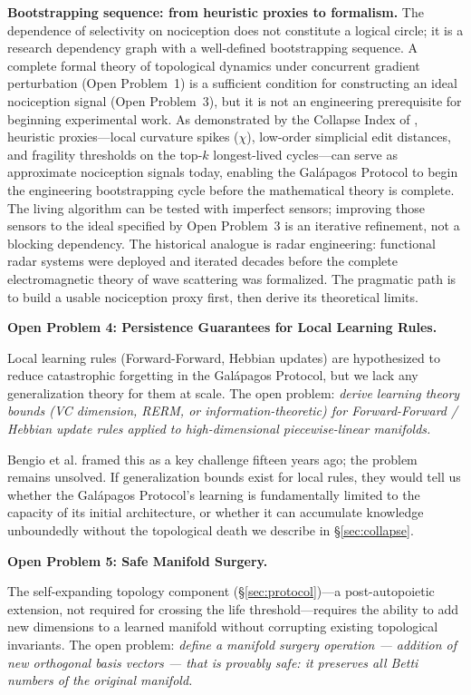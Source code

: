 \documentclass{article}
\begin{document}
\medskip
\noindent\textbf{Bootstrapping sequence: from heuristic proxies to formalism.}
The dependence of selectivity on nociception does not constitute a logical circle; it is a research dependency graph with a well-defined bootstrapping sequence. A complete formal theory of topological dynamics under concurrent gradient perturbation (Open Problem~1) is a sufficient condition for constructing an ideal nociception signal (Open Problem~3), but it is not an engineering prerequisite for beginning experimental work. As demonstrated by the Collapse Index of \citet{Kalinowski2026collapse}, heuristic proxies---local curvature spikes ($\chi$), low-order simplicial edit distances, and fragility thresholds on the top-$k$ longest-lived cycles---can serve as approximate nociception signals today, enabling the Gal\'apagos Protocol to begin the engineering bootstrapping cycle before the mathematical theory is complete. The living algorithm can be tested with imperfect sensors; improving those sensors to the ideal specified by Open Problem~3 is an iterative refinement, not a blocking dependency. The historical analogue is radar engineering: functional radar systems were deployed and iterated decades before the complete electromagnetic theory of wave scattering was formalized. The pragmatic path is to build a usable nociception proxy first, then derive its theoretical limits.

\bigskip
\noindent\textbf{Open Problem 4: Persistence Guarantees for Local Learning Rules.}

Local learning rules (Forward-Forward, Hebbian updates) are hypothesized to reduce catastrophic forgetting in the Galápagos Protocol, but we lack any generalization theory for them at scale. The open problem: \emph{derive learning theory bounds (VC dimension, RERM, or information-theoretic) for Forward-Forward / Hebbian update rules applied to high-dimensional piecewise-linear manifolds.}

Bengio et al. \citep{Bengio+chapter2007} framed this as a key challenge fifteen years ago; the problem remains unsolved. If generalization bounds exist for local rules, they would tell us whether the Galápagos Protocol's learning is fundamentally limited to the capacity of its initial architecture, or whether it can accumulate knowledge unboundedly without the topological death we describe in \S\ref{sec:collapse}.

\bigskip
\noindent\textbf{Open Problem 5: Safe Manifold Surgery.}

The self-expanding topology component (\S\ref{sec:protocol})---a post-autopoietic extension, not required for crossing the life threshold---requires the ability to add new dimensions to a learned manifold without corrupting existing topological invariants. The open problem: \emph{define a manifold surgery operation --- addition of new orthogonal basis vectors --- that is provably safe: it preserves all Betti numbers of the original manifold.}
\end{document}
